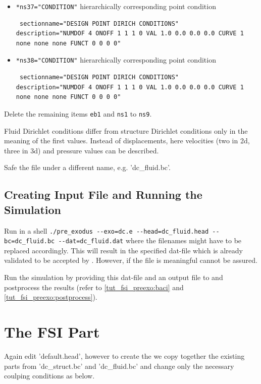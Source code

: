 \begin{itemize}
 \item \verb|*ns37="CONDITION"| \qquad hierarchically corresponding point condition
\begin{small} \begin{verbatim} sectionname="DESIGN POINT DIRICH CONDITIONS"
description="NUMDOF 4 ONOFF 1 1 1 0 VAL 1.0 0.0 0.0 0.0 CURVE 1 none none none FUNCT 0 0 0 0"
\end{verbatim} \end{small} 

\item \verb|*ns38="CONDITION"| \qquad hierarchically corresponding point condition
\begin{small} \begin{verbatim} sectionname="DESIGN POINT DIRICH CONDITIONS"
description="NUMDOF 4 ONOFF 1 1 1 0 VAL 1.0 0.0 0.0 0.0 CURVE 1 none none none FUNCT 0 0 0 0"
\end{verbatim} \end{small}

\end{itemize}

Delete the remaining items \verb|eb1| and \verb|ns1| to \verb|ns9|. \newline

Fluid Dirichlet conditions differ from structure Dirichlet conditions only in the meaning of the first values. Instead of displacements, here velocities (two in 2d, three in 3d) and pressure values can be described. 

Safe the file under a different name, e.g. 'dc\_fluid.bc'.

\subsection{Creating \baci{} Input File and Running the Simulation}
Run in a shell \verb|./pre_exodus --exo=dc.e --head=dc_fluid.head --bc=dc_fluid.bc --dat=dc_fluid.dat| where the filenames might have to be replaced accordingly. This will result in the specified dat-file which is already validated to be accepted by \baci{}. However, if the file is meaningful cannot be assured.

Run the simulation by providing this dat-file and an output file to \baci{} and postprocess the results (refer to \ref{tut_fsi_preexo:baci} and \ref{tut_fsi_preexo:postprocess}).

\section{The FSI Part}
Again edit 'default.head', however to create the \bc we copy together the existing parts from 'dc\_struct.bc' and 'dc\_fluid.bc' and change only the necessary coulping conditions as below.


